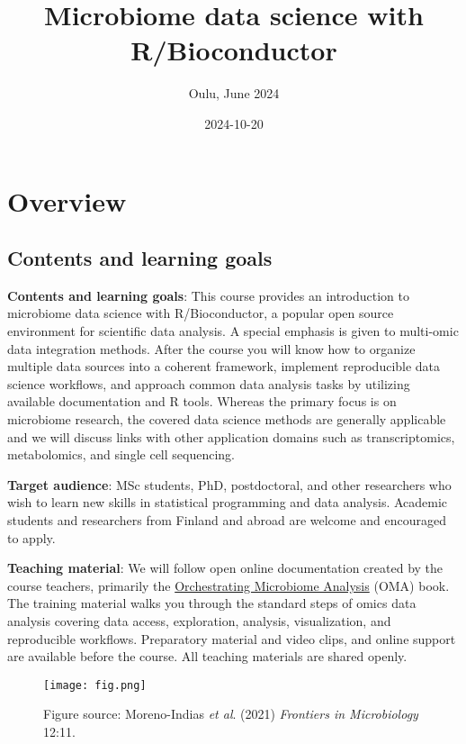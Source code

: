\documentclass[
  oneside]{book}
\title{Microbiome data science with R/Bioconductor}
\subtitle{Oulu, June 2024}
\author{}
\date{\vspace{-2.5em}2024-10-20}
\begin{document}
\maketitle

{
\setcounter{tocdepth}{1}
\tableofcontents
}
\hypertarget{overview}{%
\chapter{Overview}\label{overview}}

\hypertarget{contents-and-learning-goals}{%
\section{Contents and learning goals}\label{contents-and-learning-goals}}

\textbf{Contents and learning goals}: This course provides an introduction to microbiome data science with R/Bioconductor, a popular open source environment for scientific data analysis. A special emphasis is given to multi-omic data integration methods. After the course you will know how to organize multiple data sources into a coherent framework, implement reproducible data science workflows, and approach common data analysis tasks by utilizing available documentation and R tools. Whereas the primary focus is on microbiome research, the covered data science methods are generally applicable and we will discuss links with other application domains such as transcriptomics, metabolomics, and single cell sequencing.

\textbf{Target audience}: MSc students, PhD, postdoctoral, and other researchers who wish to learn new skills in statistical programming and data analysis. Academic students and researchers from Finland and abroad are welcome and encouraged to apply.

\textbf{Teaching material}: We will follow open online documentation created by the course teachers, primarily the \href{https://microbiome.github.io/OMA}{Orchestrating Microbiome Analysis} (OMA) book. The training material walks you through the standard steps of omics data analysis covering data access, exploration, analysis, visualization, and reproducible workflows. Preparatory material and video clips, and online support are available before the course. All teaching materials are shared openly.

\begin{figure}
\centering
\texttt{[image: fig.png]}
\caption{Figure source: Moreno-Indias \emph{et al}. (2021) \emph{Frontiers in Microbiology} 12:11.}
\end{figure}
\end{document}
